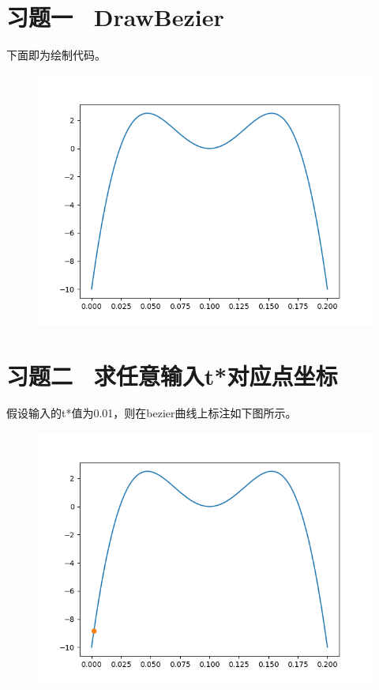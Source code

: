 \section{习题一 \ DrawBezier}
下面即为绘制代码。
\begin{figure}[hb]
    \centering
    \includegraphics[scale=0.5]{pic/bezier.png}
\end{figure}

\clearpage
\section{习题二 \ 求任意输入t*对应点坐标}
假设输入的t*值为0.01，则在bezier曲线上标注如下图所示。
\begin{figure}[hb]
    \centering
    \includegraphics[scale=0.5]{pic/2.png}
\end{figure}

